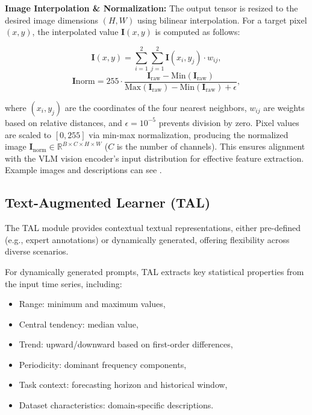 \noindent\textbf{Image Interpolation \& Normalization:} The output tensor is resized to the desired image dimensions \( (H, W) \) using bilinear interpolation. For a target pixel \( (x, y) \), the interpolated value \( \mathbf{I}(x, y) \) is computed as follows:

\vspace{-1em}
\begin{equation}
    \mathbf{I}(x, y) = \sum_{i=1}^{2} \sum_{j=1}^{2} \mathbf{I}(x_i, y_j) \cdot w_{ij},
\end{equation}
\vspace{0em}
\begin{equation}
    \mathbf{I}{\text{norm}} = 255 \cdot \frac{\mathbf{I}_{\text{raw}} - \text{Min}(\mathbf{I}_{\text{raw}})}{\text{Max}(\mathbf{I}_{\text{raw}}) - \text{Min}(\mathbf{I}_{\text{raw}}) + \epsilon},
\end{equation}
\vspace{-1em}

where \( (x_i, y_j) \) are the coordinates of the four nearest neighbors, \( w_{ij} \) are weights based on relative distances, and \(\epsilon = 10^{-5}\) prevents division by zero. Pixel values are scaled to \([0, 255]\) via min-max normalization, producing the normalized image \(\mathbf{I}_{\text{norm}} \in \mathbb{R}^{B \times C \times H \times W}\) (\( C \) is the number of channels). This ensures alignment with the VLM vision encoder's input distribution for effective feature extraction. Example images and descriptions can see .

\subsection{Text-Augmented Learner (TAL)}

The TAL module provides contextual textual representations, either pre-defined (e.g., expert annotations) or dynamically generated, offering flexibility across diverse scenarios.

For dynamically generated prompts, TAL extracts key statistical properties from the input time series, including:

\vspace{-1em}
\begin{itemize}[leftmargin=*, itemsep=0pt]
    \item Range: minimum and maximum values,
    \item Central tendency: median value,
    \item Trend: upward/downward based on first-order differences,
    \item Periodicity: dominant frequency components,
    \item Task context: forecasting horizon and historical window,
    \item Dataset characteristics: domain-specific descriptions.
\end{itemize}
\vspace{-1em}

